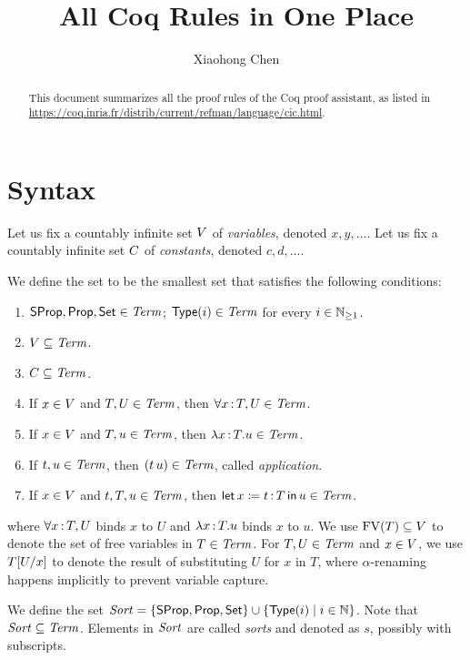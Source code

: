 \documentclass{article}
\title{All Coq Rules in One Place}
\author{Xiaohong Chen}
\begin{document}
\maketitle

\begin{abstract}
This document summarizes all the proof rules of the Coq proof assistant,
as listed in 
\url{https://coq.inria.fr/distrib/current/refman/language/cic.html}.
\end{abstract}

\section{Syntax}

Let us fix a countably infinite set $V$ of \emph{variables}, denoted 
$x,y,\dots$. 
Let us fix a countably infinite set $C$ of \emph{constants}, denoted
$c,d,\dots$.

\begin{definition}
We define the set \CoqTerm to be the smallest set that satisfies the following 
conditions:
\begin{enumerate}
\item $\mathsf{SProp},\mathsf{Prop},\mathsf{Set} \in \textnormal{\textit{Term}}$; $\mathsf{Type}(i) \in \textnormal{\textit{Term}}$ for every $i 
\in {\mathbb{N}_{\ge 1}}$. 
\item $V \subseteq \textnormal{\textit{Term}}$.
\item $C \subseteq \textnormal{\textit{Term}}$.
\item If $x \in V$ and $T,U \in \textnormal{\textit{Term}}$, 
      then $\forall x {\,:\,} T , U \in \textnormal{\textit{Term}}$.
\item If $x \in V$ and $T,u \in \textnormal{\textit{Term}}$,
      then $\lambda x {\,:\,} T . u \in \textnormal{\textit{Term}}$.
\item If $t,u \in \textnormal{\textit{Term}}$,
      then $(t \, u) \in \textnormal{\textit{Term}}$, called \emph{application}.
\item If $x \in V$ and $t,T,u \in \textnormal{\textit{Term}}$,
      then $\textsf{let} \, x \coloneqq t {\,:\,} T \,\textsf{in}\, u \in \textnormal{\textit{Term}}$.
\end{enumerate}
where $\forall x {\,:\,} T , U$ binds $x$ to $U$
and $\lambda x {\,:\,} T . u$ binds $x$ to $u$.
We use $\mathrm{FV}(T) \subseteq V$ to denote the set of free variables in $T \in 
\textnormal{\textit{Term}}$. 
For $T,U \in \textnormal{\textit{Term}}$ and $x \in V$, 
we use $T [ U / x ]$ to denote the result of substituting $U$ for $x$ in $T$,
where $\alpha$-renaming happens implicitly to prevent variable capture.
\end{definition}

\begin{definition}
We define the set 
$\textnormal{\textit{Sort}} = \{\mathsf{SProp},\mathsf{Prop},\mathsf{Set}\} \cup \{\mathsf{Type}(i) \mid i \in \mathbb{N}\}$.
Note that $\textnormal{\textit{Sort}} \subseteq \textnormal{\textit{Term}}$. 
Elements in $\textnormal{\textit{Sort}}$ are called \emph{sorts} and denoted as $s$,
possibly with subscripts.
\end{definition}
\end{document}
